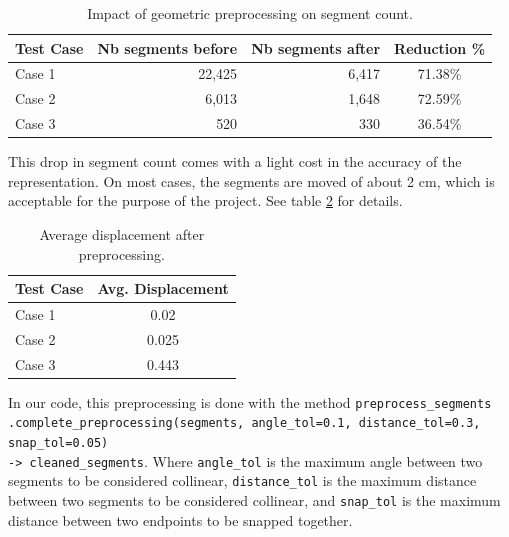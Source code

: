 \documentclass[11pt]{article}
\begin{document}
\begin{table}[htb!]
    \centering
    \begin{tabular}{|l|rrc|}
        \hline
        \textbf{Test Case} & \textbf{Nb segments before} & \textbf{Nb segments after} & \textbf{Reduction \%} \\
        \hline

        Case 1 & 22,425 & 6,417 & 71.38\% \\
        Case 2 & 6,013 & 1,648 & 72.59\% \\
        Case 3 & 520 & 330 & 36.54\% \\
        \hline
    \end{tabular}
    \caption{Impact of geometric preprocessing on segment count.}
    \label{tab:segment_count}
\end{table}

This drop in segment count comes with a light cost in the accuracy of the representation.
On most cases, the segments are moved of about 2 cm, which is acceptable for the
purpose of the project. See table \ref{tab:avg_displacement} for details.

\begin{table}[htb!]
    \centering
    \begin{tabular}{|l|c|}
        \hline

        \textbf{Test Case} & \textbf{Avg. Displacement} \\
        \hline
        Case 1 & 0.02 \\
        Case 2 & 0.025 \\
        Case 3 & 0.443 \\
        \hline

    \end{tabular}
    \caption{Average displacement after preprocessing.}
    \label{tab:avg_displacement}
\end{table}

In our code, this preprocessing is done with the method 
\texttt{preprocess\_segments\\.complete\_preprocessing(segments, angle\_tol=0.1, distance\_tol=0.3, snap\_tol=0.05)\\ -> cleaned\_segments}. 
    Where \texttt{angle\_tol} is the maximum angle between two segments to be considered collinear,
    \texttt{distance\_tol} is the maximum distance between two segments to be considered collinear,
    and \texttt{snap\_tol} is the maximum distance between two endpoints to be snapped together.

\end{document}
